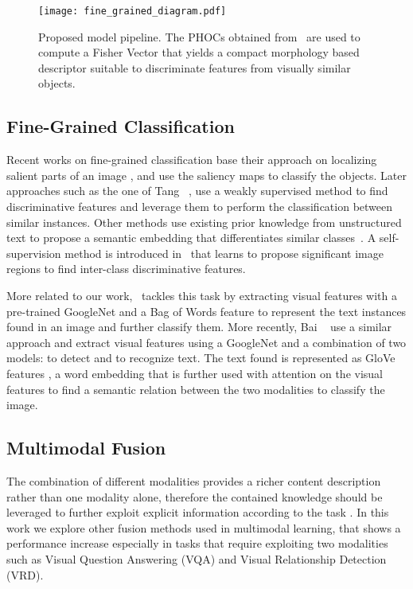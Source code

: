 \documentclass[10pt,twocolumn,letterpaper]{article}
\begin{document}
\begin{figure*}[ht]
\begin{center}
\texttt{[image: fine\_grained\_diagram.pdf]}
\end{center}
\caption{Proposed model pipeline. The PHOCs obtained from~\cite{Gomez_2018_ECCV} are used to compute a Fisher Vector that yields a compact morphology based descriptor suitable to discriminate features from visually similar objects.}
\label{fig:model}
\end{figure*}

\subsection{Fine-Grained Classification}
Recent works on fine-grained classification base their approach on localizing salient parts of an image \cite{deng2013fine,yang2012unsupervised}, and use the saliency maps to classify the objects. 
Later approaches such as the one of Tang \etal~\cite{tang2017learning}, use a weakly supervised method to find discriminative features and leverage them to perform the classification between similar instances. Other methods use existing prior knowledge from unstructured text to propose a semantic embedding that differentiates similar classes~\cite{xu2018fine}. A self-supervision method is introduced in~\cite{yang2018learning} that learns to propose significant image regions to find inter-class discriminative features.

More related to our work,~\cite{karaoglu2017words} tackles this task by extracting visual features with a pre-trained GoogleNet \cite{szegedy2015going} and a Bag of Words feature to represent the text instances found in an image and further classify them. More recently, Bai \etal~\cite{bai2018integrating} use a similar approach and extract visual features using a GoogleNet and a combination of two models: \cite{liao2017textboxes} to detect and \cite{shi2017end} to recognize text. The text found is represented as GloVe features \cite{pennington2014glove}, a word embedding that is further used with attention on the visual features to find a semantic relation between the two modalities to classify the image.




\subsection{Multimodal Fusion}
\label{sec:mult_fusion}

The combination of different modalities provides a richer content description rather than one modality alone, therefore the contained knowledge should be leveraged to further exploit explicit information according to the task \cite{srivastava2012multimodal}. 
In this work we explore other fusion methods used in multimodal learning, that shows a performance increase especially in tasks that require exploiting two modalities such as Visual Question Answering (VQA) and Visual Relationship Detection (VRD). 
\end{document}
